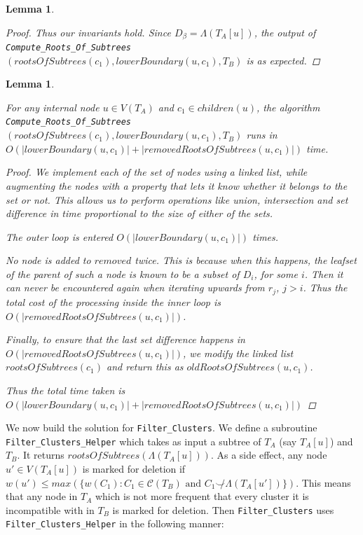 \documentclass{article}
\newcommand{\compatible}{\smile}
\newcommand{\leafset}{\Lambda}
\newtheorem{computerootsofsubtreescorrectness}[incompatibility]{Lemma}
\newtheorem{computerootsofsubtreesruntime}[incompatibility]{Lemma}
\begin{document}
\begin{computerootsofsubtreescorrectness}
\begin{proof}
            Thus our invariants hold. Since $D_{\beta} = \leafset(T_A[u])$, the output of \texttt{Compute\_Roots\_Of\_Subtrees}$(rootsOfSubtrees(c_1), lowerBoundary(u, c_1), T_B)$ is as expected.
        \end{proof}
    \end{computerootsofsubtreescorrectness}

    \begin{computerootsofsubtreesruntime}
        \label{lem:computerootsofsubtreesruntime}

        For any internal node $u \in V(T_A)$ and $c_1 \in children(u)$, the algorithm \texttt{Compute\_Roots\_Of\_Subtrees}$(rootsOfSubtrees(c_1), lowerBoundary(u, c_1), T_B)$ runs in $O(|lowerBoundary(u, c_1)| + |removedRootsOfSubtrees(u, c_1)|)$ time.

        \begin{proof}
            We implement each of the set of nodes using a linked list, while augmenting the nodes with a property that lets it know whether it belongs to the set or not. This allows us to perform operations like union, intersection and set difference in time proportional to the size of either of the sets.

            The outer loop is entered $O(|lowerBoundary(u, c_1)|)$ times.

            No node is added to $removed$ twice. This is because when this happens, the leafset of the parent of such a node is known to be a subset of $D_i$, for some $i$. Then it can never be encountered again when iterating upwards from $r_j$, $j > i$. Thus the total cost of the processing inside the inner loop is $O(|removedRootsOfSubtrees(u, c_1)|)$.

            Finally, to ensure that the last set difference happens in $O(|removedRootsOfSubtrees(u, c_1)|)$, we modify the linked list $rootsOfSubtrees(c_1)$ and return this as $oldRootsOfSubtrees(u, c_1)$.

            Thus the total time taken is $O(|lowerBoundary(u, c_1)| + |removedRootsOfSubtrees(u, c_1)|)$
        \end{proof}
    \end{computerootsofsubtreesruntime}

    We now build the solution for \texttt{Filter\_Clusters}. We define a subroutine \texttt{Filter\_Clusters\_Helper} which takes as input a subtree of $T_A$ (say $T_A[u]$) and $T_B$. It returns $rootsOfSubtrees(\leafset(T_A[u]))$. As a side effect, any node $u' \in V(T_A[u])$ is marked for deletion if $w(u') \leq max(\{w(C_1) : C_1 \in \mathcal{C}(T_B) \text{ and } C_1 \not\compatible \leafset(T_A[u'])\})$. This means that any node in $T_A$ which is not more frequent that every cluster it is incompatible with in $T_B$ is marked for deletion. Then \texttt{Filter\_Clusters} uses \texttt{Filter\_Clusters\_Helper} in the following manner:
\end{document}
